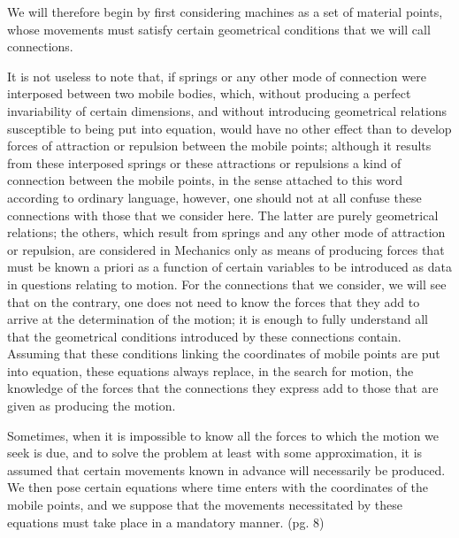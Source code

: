 \documentclass{book}
\begin{document}
We will therefore begin by first considering machines as a set of material points, whose movements must satisfy certain geometrical conditions that we will call connections.

It is not useless to note that, if springs or any other mode of connection were interposed between two mobile bodies, which, without producing a perfect invariability of certain dimensions, and without introducing geometrical relations susceptible to being put into equation, would have no other effect than to develop forces of attraction or repulsion between the mobile points; although it results from these interposed springs or these attractions or repulsions a kind of connection between the mobile points, in the sense attached to this word according to ordinary language, however, one should not at all confuse these connections with those that we consider here. The latter are purely geometrical relations; the others, which result from springs and any other mode of attraction or repulsion, are considered in Mechanics only as means of producing forces that must be known a priori as a function of certain variables to be introduced as data in questions relating to motion. For the connections that we consider, we will see that on the contrary, one does not need to know the forces that they add to arrive at the determination of the motion; it is enough to fully understand all that the geometrical conditions introduced by these connections contain. Assuming that these conditions linking the coordinates of mobile points are put into equation, these equations always replace, in the search for motion, the knowledge of the forces that the connections they express add to those that are given as producing the motion.

Sometimes, when it is impossible to know all the forces to which the motion we seek is due, and to solve the problem at least with some approximation, it is assumed that certain movements known in advance will necessarily be produced. We then pose certain equations where time enters with the coordinates of the mobile points, and we suppose that the movements necessitated by these equations must take place in a mandatory manner.
\newpage
(pg. 8)\\
\end{document}
